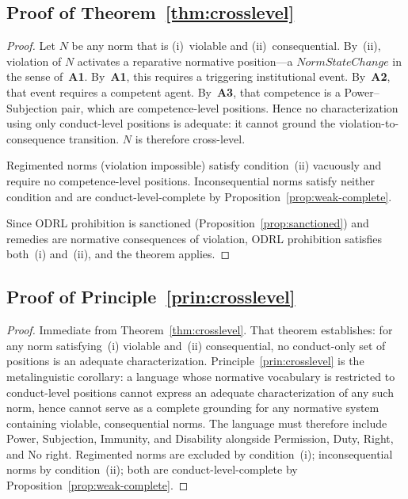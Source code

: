 \documentclass{IOS-Book-Article}
\theoremstyle{definition}
\begin{document}
\subsection*{Proof of Theorem~\ref{thm:crosslevel}}
\label{app:proof:crosslevel}
\begin{proof}
Let $N$ be any norm that is (i)~violable and
(ii)~consequential. By~(ii), violation of $N$ activates a
reparative normative position---a $\mathit{NormStateChange}$
in the sense of~\textbf{A1}. By~\textbf{A1}, this requires a
triggering institutional event. By~\textbf{A2}, that event
requires a competent agent. By~\textbf{A3}, that competence
is a Power--Subjection pair, which are competence-level
positions. Hence no characterization using only conduct-level
positions is adequate: it cannot ground the
violation-to-consequence transition. $N$ is therefore
cross-level.

\noindent Regimented norms (violation impossible) satisfy
condition~(ii) vacuously and require no competence-level
positions. Inconsequential norms satisfy neither condition
and are conduct-level-complete by
Proposition~\ref{prop:weak-complete}.

\noindent Since ODRL prohibition is sanctioned
(Proposition~\ref{prop:sanctioned}) and remedies are
normative consequences of violation, ODRL prohibition
satisfies both~(i) and~(ii), and the theorem applies.
\end{proof}

\subsection*{Proof of Principle~\ref{prin:crosslevel}}
\label{app:proof:principle}
\begin{proof}
Immediate from Theorem~\ref{thm:crosslevel}.
That theorem establishes: for any norm satisfying~(i)
violable and~(ii) consequential, no conduct-only set of
positions is an adequate characterization.
Principle~\ref{prin:crosslevel} is the metalinguistic
corollary: a language whose normative vocabulary is
restricted to conduct-level positions cannot express an
adequate characterization of any such norm, hence cannot
serve as a complete grounding for any normative system
containing violable, consequential norms.
The language must therefore include Power, Subjection,
Immunity, and Disability alongside Permission, Duty,
Right, and No right.
Regimented norms are excluded by condition~(i);
inconsequential norms by condition~(ii); both are
conduct-level-complete by
Proposition~\ref{prop:weak-complete}.
\end{proof}
\end{document}
